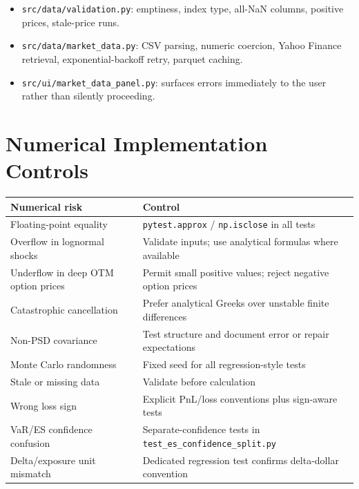 \documentclass[11pt]{article}
\newcommand{\code}[1]{\texttt{#1}}
\begin{document}
\begin{itemize}
  \item \code{src/data/validation.py}: emptiness, index type, all-NaN
    columns, positive prices, stale-price runs.
  \item \code{src/data/market\_data.py}: CSV parsing, numeric coercion,
    Yahoo Finance retrieval, exponential-backoff retry, parquet caching.
  \item \code{src/ui/market\_data\_panel.py}: surfaces errors immediately
    to the user rather than silently proceeding.
\end{itemize}

\section{Numerical Implementation Controls}

\begin{center}
\begin{tabular}{L{6cm}L{7.5cm}}
\toprule
\textbf{Numerical risk} & \textbf{Control} \\
\midrule
Floating-point equality             & \code{pytest.approx} / \code{np.isclose} in all tests \\
Overflow in lognormal shocks        & Validate inputs; use analytical formulas where available \\
Underflow in deep OTM option prices & Permit small positive values; reject negative option prices \\
Catastrophic cancellation           & Prefer analytical Greeks over unstable finite differences \\
Non-PSD covariance                  & Test structure and document error or repair expectations \\
Monte Carlo randomness              & Fixed seed for all regression-style tests \\
Stale or missing data               & Validate before calculation \\
Wrong loss sign                     & Explicit PnL/loss conventions plus sign-aware tests \\
VaR/ES confidence confusion         & Separate-confidence tests in \code{test\_es\_confidence\_split.py} \\
Delta/exposure unit mismatch        & Dedicated regression test confirms delta-dollar convention \\
\bottomrule
\end{tabular}
\end{center}
\end{document}
